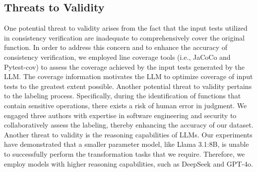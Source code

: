 % 

\subsection{Threats to Validity}
One potential threat to validity arises from the fact that the input tests utilized in consistency verification are inadequate to comprehensively cover the original function. 
In order to address this concern and to enhance the accuracy of consistency verification, we employed line coverage tools (i.e., JaCoCo and Pytest-cov) to assess the coverage achieved by the input tests generated by the LLM. 
The coverage information motivates the LLM to optimize coverage of input tests to the greatest extent possible.
Another potential threat to validity pertains to the labeling process. Specifically, during the identification of functions that contain sensitive operations, there exists a risk of human error in judgment.
We engaged three authors with expertise in software engineering and security to collaboratively assess the labeling, thereby enhancing the accuracy of our dataset.
Another threat to validity is the reasoning capabilities of LLMs. 
Our experiments have demonstrated that a smaller parameter model, like Llama 3.1:8B, is unable to successfully perform the transformation tasks that we require.
Therefore, we employ models with higher reasoning capabilities, such as DeepSeek and GPT-4o.